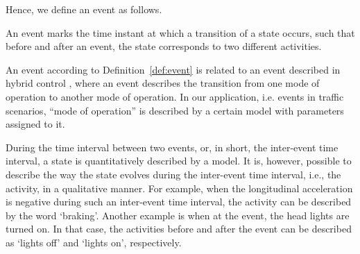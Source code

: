 Hence, we define an event as follows.
\begin{definition}[Event] \label{def:event}
	An event marks the time instant at which a transition of a state occurs, such that before and after an event, the state corresponds to two different activities.  %
\end{definition}

An event according to Definition~\ref{def:event} is related to an event described in hybrid control \cite{deschutter2000optimal}, where an event describes the transition from one mode of operation to another mode of operation. In our application, i.e. events in traffic scenarios, ``mode of operation'' is described by a certain model with parameters assigned to it.

During the time interval between two events, or, in short, the inter-event time interval, a state is quantitatively described by a model. It is, however, possible to describe the way the state evolves during the inter-event time interval, i.e., the activity, in a qualitative manner. For example, when the longitudinal acceleration is negative during such an inter-event time interval, the activity can be described by the word `braking'. Another example is when at the event, the head lights are turned on. In that case, the activities before and after the event can be described as `lights off' and `lights on', respectively.
